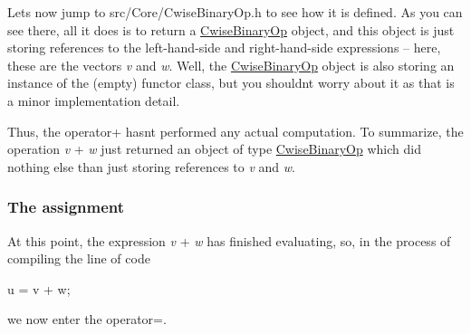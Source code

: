 Let\textquotesingle{}s now jump to src/\+Core/\+Cwise\+Binary\+Op.\+h to see how it is defined. As you can see there, all it does is to return a \hyperlink{group___core___module_class_eigen_1_1_cwise_binary_op}{Cwise\+Binary\+Op} object, and this object is just storing references to the left-\/hand-\/side and right-\/hand-\/side expressions -- here, these are the vectors {\itshape v} and {\itshape w}. Well, the \hyperlink{group___core___module_class_eigen_1_1_cwise_binary_op}{Cwise\+Binary\+Op} object is also storing an instance of the (empty) functor class, but you shouldn\textquotesingle{}t worry about it as that is a minor implementation detail.

Thus, the operator+ hasn\textquotesingle{}t performed any actual computation. To summarize, the operation {\itshape v} + {\itshape w} just returned an object of type \hyperlink{group___core___module_class_eigen_1_1_cwise_binary_op}{Cwise\+Binary\+Op} which did nothing else than just storing references to {\itshape v} and {\itshape w}.\hypertarget{_topic_inside_eigen_example_Assignment}{}\subsubsection{The assignment}\label{_topic_inside_eigen_example_Assignment}
At this point, the expression {\itshape v} + {\itshape w} has finished evaluating, so, in the process of compiling the line of code 
\begin{DoxyCode}
u = v + w;
\end{DoxyCode}
 we now enter the operator=.

